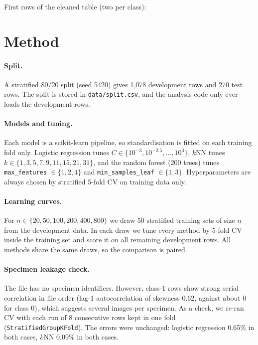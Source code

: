 \documentclass{article}
\begin{document}
\begin{table}[h]
  \centering
  \caption{Data size and shape at each stage. ``Forged'' is the share of class 1.}
  \label{tab:data}
  
  \vspace{4pt}

  \small First rows of the cleaned table (two per class):\\[2pt]
  
\end{table}

\section{Method}
\paragraph{Split.} A stratified 80/20 split (seed 5420) gives 1,078 development rows and 270 test rows. The split is stored in \texttt{data/split.csv}, and the analysis code only ever loads the development rows.

\paragraph{Models and tuning.} Each model is a scikit-learn pipeline, so standardisation is fitted on each training fold only. Logistic regression tunes $C \in \{10^{-3}, 10^{-2.5}, \dots, 10^{3}\}$, $k$NN tunes $k \in \{1,3,5,7,9,11,15,21,31\}$, and the random forest (200 trees) tunes \texttt{max\_features} $\in\{1,2,4\}$ and \texttt{min\_samples\_leaf} $\in\{1,3\}$. Hyperparameters are always chosen by stratified 5-fold CV on training data only.

\paragraph{Learning curves.} For $n \in \{20, 50, 100, 200, 400, 800\}$ we draw 50 stratified training sets of size $n$ from the development data. In each draw we tune every method by 5-fold CV inside the training set and score it on all remaining development rows. All methods share the same draws, so the comparison is paired.

\paragraph{Specimen leakage check.} The file has no specimen identifiers. However, class-1 rows show strong serial correlation in file order (lag-1 autocorrelation of skewness 0.62, against about 0 for class 0), which suggests several images per specimen. As a check, we re-ran CV with each run of 8 consecutive rows kept in one fold (\texttt{StratifiedGroupKFold}). The errors were unchanged: logistic regression 0.65\% in both cases, $k$NN 0.09\% in both cases.
\end{document}
